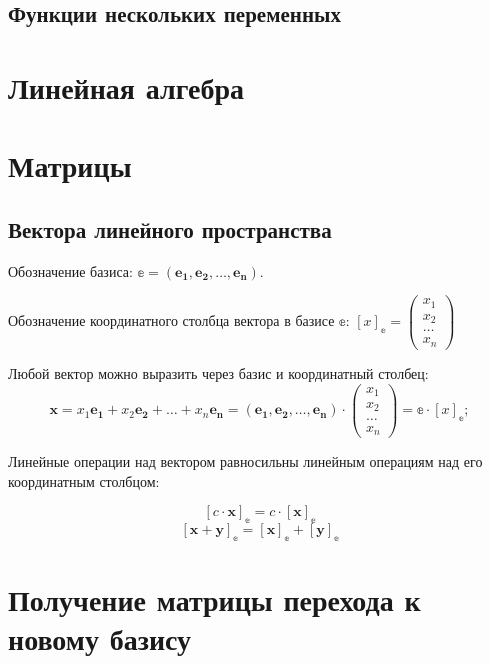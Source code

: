 \subsection{Функции нескольких переменных}


\section{Линейная алгебра}

\section{Матрицы}

\subsection{Вектора линейного пространства}

Обозначение базиса: $\mathbb{e} = (\boldsymbol{e_1}, \boldsymbol{e_2}, \dots, \boldsymbol{e_n})$.

Обозначение координатного столбца вектора в базисе $\mathbb{e}$: $[x]_\mathbb{e} = 
\begin{pmatrix}
	x_1\\
	x_2\\
	\dots\\
	x_n
\end{pmatrix} $  

Любой вектор можно выразить через базис и координатный столбец: 
$$
	\boldsymbol{x} = x_1\boldsymbol{e_1} + x_2\boldsymbol{e_2} + \dots + x_n\boldsymbol{e_n} = (\boldsymbol{e_1}, \boldsymbol{e_2}, \dots, \boldsymbol{e_n}) \cdot 
	\begin{pmatrix}
		x_1\\
		x_2\\
		\dots\\
		x_n
	\end{pmatrix} = \mathbb{e}\cdot [x]_\mathbb{e}; 
$$

Линейные операции над вектором равносильны линейным операциям над его координатным столбцом:

$$ [c\cdot \boldsymbol{x}]_\mathbb{e} = c\cdot [\boldsymbol{x}]_\mathbb{e} $$
$$ [\boldsymbol{x} + \boldsymbol{y}]_\mathbb{e} = [\boldsymbol{x}]_\mathbb{e} + [\boldsymbol{y}]_\mathbb{e} $$

\section{Получение матрицы перехода к новому базису}

